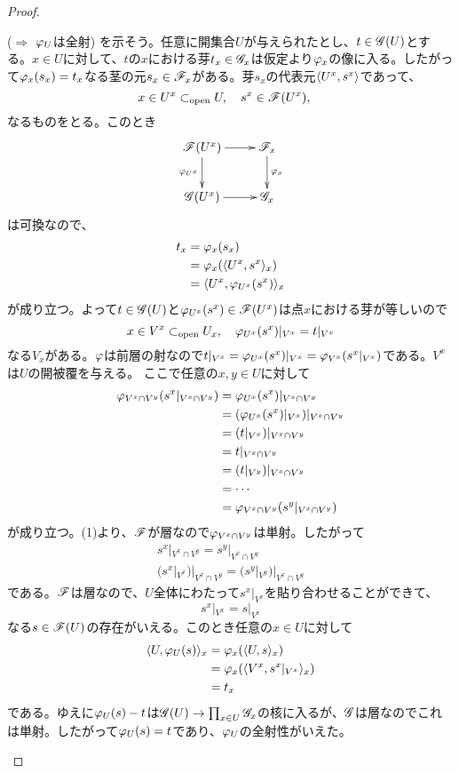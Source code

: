 \begin{proof}
\begin{description}
  ($\Rightarrow$ ${\varphi}_U$は全射) を示そう。任意に開集合$U$が与えられたとし、$t \in \mathscr{G}(U)$とする。$x \in U$に対して、$t$の$x$における芽$t_x \in \mathscr{G}_x$は仮定より${\varphi}_x$の像に入る。したがって${\varphi}_x(s_x) = t_x$なる茎の元$s_x \in \mathscr{F}_x$がある。芽$s_x$の代表元$\langle U^x,s^x \rangle$であって、
  \[
  x \in U^x \subset_{\text{open}} U, \quad s^x \in \mathscr{F}(U^x) , \quad
  \]
  なるものをとる。このとき
  \[
  \xymatrix{
\scrf(U^x) \ar[r] \ar[d]_-{\vp_{U^x}} &  \scrf_x \ar[d]^-{ \vp_x} \\
\scrg(U^x) \ar[r] &  \scrg_x
  }
  \]
  は可換なので、
  \begin{align*}
    t_x &= {\varphi}_x(s_x) \\
    &= {\varphi}_x(\langle U^x,s^x \rangle_x) \\
    &= \langle U^x,{\varphi}_{U^x}(s^x)  \rangle_x
  \end{align*}
  が成り立つ。よって$t \in \mathscr{G}(U)$と${\varphi}_{U^x}(s^x) \in \mathscr{F}(U^x)$は点$x$における芽が等しいので
  \[
  x \in V^x \subset_{\text{open}} U_x, \quad {\varphi}_{U^x}(s^x)|_{V^x} = t|_{V^x}
  \]
  なる$V_x$がある。${\varphi}$は前層の射なので$t|_{V^x} = {\varphi}_{U^x}(s^x)|_{V^x} = {\varphi}_{V^x}(s^x|_{V^x})$である。$V^x$は$U$の開被覆を与える。
  ここで任意の$x , y \in U$に対して
  \begin{align*}
    {\varphi}_{V^x \cap V^y} (s^x|_{V^x \cap V^y}) &=   {\varphi}_{U^x}(s^x)|_{V^x \cap V^y} \\
    &=  ({\varphi}_{U^x}(s^x)|_{V^x} )|_{V^x \cap V^y} \\
    &= (t|_{V^x})|_{V^x \cap V^y} \\
    &= t|_{V^x \cap V^y} \\
    &= (t|_{V^y})|_{V^x \cap V^y} \\
    &= \cdots \\
    &= {\varphi}_{V^x \cap V^y} (s^y|_{V^x \cap V^y})
  \end{align*}
  が成り立つ。(1)より、$\mathscr{F}$が層なので${\varphi}_{V^x \cap V^y}$は単射。したがって
  \begin{gather*}
s^x|_{V^x \cap V^y} = s^y|_{V^x \cap V^y} \\
(s^x|_{V^x}) |_{V^x \cap V^y} = (s^y|_{V^y})|_{V^x \cap V^y}
  \end{gather*}
  である。$\mathscr{F}$は層なので、$U$全体にわたって$s^x|_{V^x}$を貼り合わせることができて、
  \[
  s^x|_{V^x} = s|_{V^x}
  \]
  なる$s \in \mathscr{F}(U)$の存在がいえる。このとき任意の$x \in U$に対して
  \begin{align*}
    \langle U,{\varphi}_U(s) \rangle_x &= {\varphi}_x(\langle U,s \rangle_x) \\
    &= {\varphi}_x(\langle V^x,s^x|_{V^x} \rangle_x) \\
    &= t_x
  \end{align*}
  である。ゆえに${\varphi}_U(s) - t $は$\mathscr{G}(U) \to \prod_{x \in U} \mathscr{G}_x$の核に入るが、$\mathscr{G}$は層なのでこれは単射。したがって${\varphi}_U(s)=t$であり、${\varphi}_U$の全射性がいえた。
\end{description}
\end{proof}




